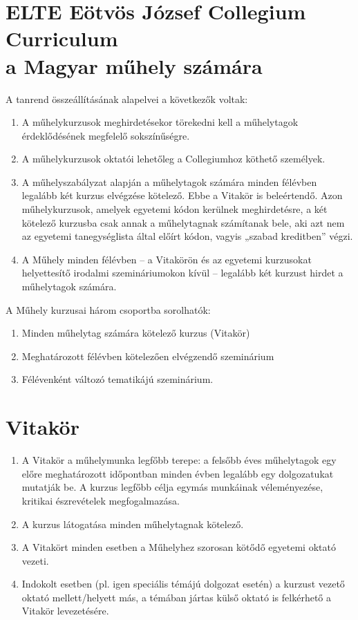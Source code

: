 \documentclass{../styles/curriculum}
\begin{document}
\section*{ELTE Eötvös József Collegium \\ \vspace{0.5em} Curriculum \\ {\normalfont a Magyar műhely számára} } 

\vspace{2em}


\noindent A tanrend összeállításának alapelvei a következők voltak:
\begin{enumerate}
	\item A műhelykurzusok meghirdetésekor törekedni kell a műhelytagok érdeklődésének megfelelő sokszínűségre.
	\item A műhelykurzusok oktatói lehetőleg a Collegiumhoz köthető személyek.
	\item A műhelyszabályzat alapján a műhelytagok számára minden félévben legalább két kurzus elvégzése kötelező. Ebbe a Vitakör is beleértendő. Azon műhelykurzusok, amelyek egyetemi kódon kerülnek meghirdetésre, a két kötelező kurzusba csak annak a műhelytagnak számítanak bele, aki azt nem az egyetemi tanegységlista által előírt kódon, vagyis „szabad kreditben” végzi.
	\item A Műhely minden félévben – a Vitakörön és az egyetemi kurzusokat helyettesítő irodalmi szemináriumokon kívül – legalább két kurzust hirdet a műhelytagok számára.
\end{enumerate}
A Műhely kurzusai három csoportba sorolhatók:

\begin{enumerate}[label=\Roman*., itemsep=0ex]
	\item Minden műhelytag számára kötelező kurzus (Vitakör)
	\item Meghatározott félévben kötelezően elvégzendő szeminárium
	\item Félévenként változó tematikájú szeminárium.
\end{enumerate}


\section{Vitakör}

\begin{enumerate}
	\item A Vitakör a műhelymunka legfőbb terepe: a felsőbb éves műhelytagok egy előre meghatározott időpontban minden évben legalább egy dolgozatukat mutatják be. A kurzus legfőbb célja egymás munkáinak véleményezése, kritikai észrevételek megfogalmazása.
	\item A kurzus látogatása minden műhelytagnak kötelező.
	\item A Vitakört minden esetben a Műhelyhez szorosan kötődő egyetemi oktató vezeti.
	\item Indokolt esetben (pl. igen speciális témájú dolgozat esetén) a kurzust  vezető oktató mellett/helyett más, a témában jártas külső oktató is felkérhető a Vitakör levezetésére.
\end{enumerate}
\end{document}
